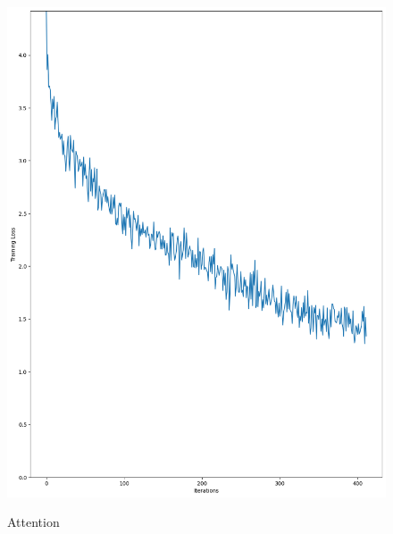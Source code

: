 \documentclass{article}
\begin{document}
\begin{figure}[htbp]
\begin{minipage}[t]{0.19\textwidth}
        \includegraphics[width=\textwidth]{img/Attention_learning.png} \\
        \caption{Attention}
        \label{fig:attention}
    \end{minipage}
    \hfill
    \begin{minipage}[t]{0.19\textwidth}
        \centering

\end{minipage}
\end{figure}
\end{document}
